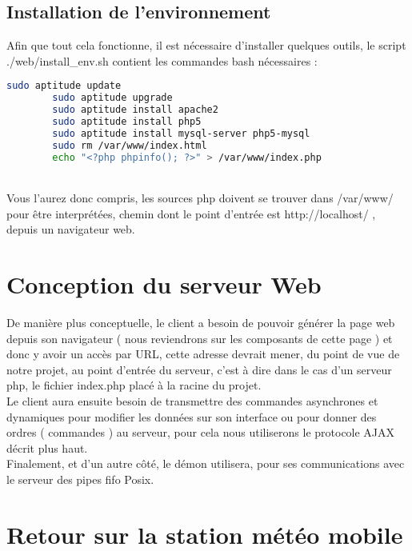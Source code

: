\subsection{Installation de l'environnement}

Afin que tout cela fonctionne, il est nécessaire d’installer quelques outils, le script ./web/install\_env.sh contient les commandes bash nécessaires :\\

\begin{DDbox}{\linewidth}
\begin{lstlisting}[language=bash]
        sudo aptitude update
        sudo aptitude upgrade
        sudo aptitude install apache2
        sudo aptitude install php5
        sudo aptitude install mysql-server php5-mysql
        sudo rm /var/www/index.html
        echo "<?php phpinfo(); ?>" > /var/www/index.php
\end{lstlisting}
\end{DDbox}
\\
Vous l’aurez donc compris, les sources php doivent se trouver dans /var/www/ pour être interprétées, chemin dont le point d’entrée est http://localhost/ , depuis un navigateur web.


\section{Conception du serveur Web}

De manière plus conceptuelle, le client a besoin de pouvoir générer la page web depuis son navigateur ( nous reviendrons sur les composants de cette page ) et donc y avoir un accès par URL, cette adresse devrait mener, du point de vue de notre projet, au point d’entrée du serveur, c’est à dire dans le cas d’un serveur php, le fichier index.php placé à la racine du projet.\\
Le client aura ensuite besoin de transmettre des commandes asynchrones et dynamiques pour modifier les données sur son interface ou pour donner des ordres ( commandes ) au serveur, pour cela nous utiliserons le protocole AJAX décrit plus haut.\\
Finalement, et d’un autre côté, le démon utilisera, pour ses communications avec le serveur des pipes fifo Posix.

\section{Retour sur la station météo mobile}

